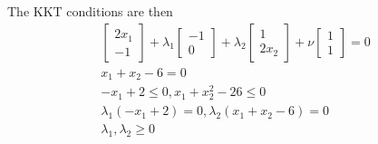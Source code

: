 The KKT conditions are then
\begin{align}
  \begin{bmatrix}
     2x_1 \\ -1
  \end{bmatrix} 
  +
  \lambda_1
  \begin{bmatrix}
    -1 \\ 0
  \end{bmatrix}
  +
  \lambda_2
  \begin{bmatrix}
    1 \\ 2x_2
  \end{bmatrix}
  +
  \nu
  \begin{bmatrix}
    1 \\ 1
  \end{bmatrix}
  = 0 
  \\
  x_1 + x_2 - 6 = 0
  \\
  -x_1 + 2 \leq 0, x_1 + x_2^2 - 26 \leq 0
  \\
  \lambda_1 (-x_1 + 2) = 0, \lambda_2 (x_1 + x_2 -6) = 0 
  \\
  \lambda_1, \lambda_2 \geq 0
\end{align}